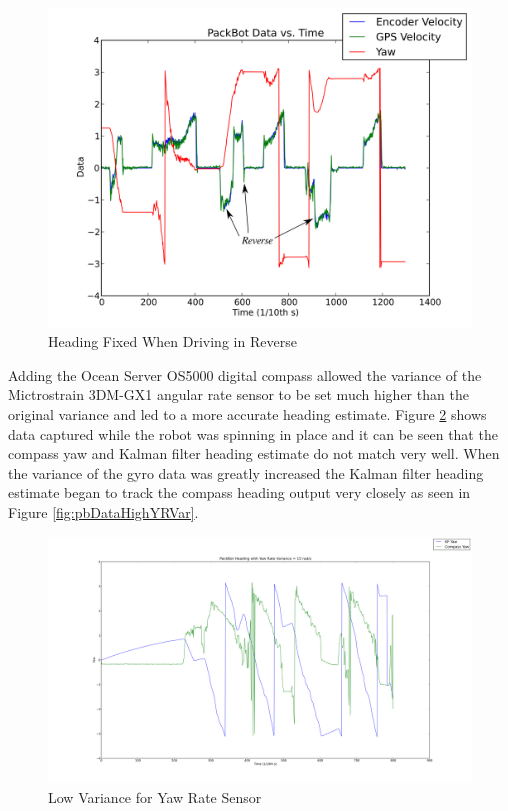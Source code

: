 \begin{figure}[ht!]
	\centering
	\includegraphics[width=.7\textwidth]{images/KFDataHeadingReverseFixed}
	\caption{Heading Fixed When Driving in Reverse}
	\label{fig:pbDataReverseHeadingFixed}
\end{figure}

Adding the Ocean Server OS5000 digital compass allowed the variance of the Mictrostrain 3DM-GX1 angular rate sensor to be set much higher than the original variance and led to a more accurate heading estimate. Figure \ref{fig:pbDataLowYRVar} shows data captured while the robot was spinning in place and it can be seen that the compass yaw and Kalman filter heading estimate do not match very well. When the variance of the gyro data was greatly increased the Kalman filter heading estimate began to track the compass heading output very closely as seen in Figure \ref{fig:pbDataHighYRVar}.

\begin{figure}[ht!]
	\centering
	\includegraphics[width=.8\textwidth]{images/pbDataLowYRVar}
	\caption{Low Variance for Yaw Rate Sensor}
	\label{fig:pbDataLowYRVar}
\end{figure}

